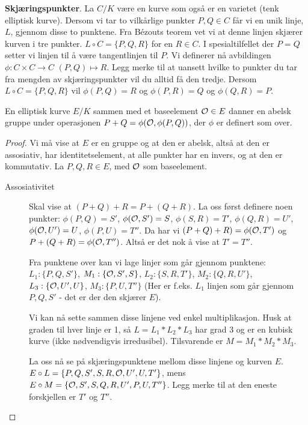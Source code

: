 \textbf{Skjæringspunkter}. La $C/K$ være en kurve som også er en varietet (tenk elliptisk kurve). Dersom vi tar to vilkårlige punkter $P, Q \in C$ får vi en unik linje, $L$, gjennom disse to punktene. Fra Bézouts teorem vet vi at denne linjen skjærer kurven i tre punkter. $L \circ C = \{P, Q, R \}$ for en $R \in C$. I spesialtilfellet der $P = Q$ setter vi linjen til å være tangentlinjen til $P$. Vi definerer nå avbildingen $\phi: C \times C \rightarrow C$ $(P, Q) \mapsto R$. Legg merke til at uansett hvilke to punkter du tar fra mengden av skjæringspunkter vil du alltid få den tredje. Dersom $L \circ C = \{P, Q, R\}$ vil $\phi(P, Q) = R$ og $\phi(P, R) = Q$ og $\phi(Q, R) = P$.

\begin{teorem}
En elliptisk kurve $E/K$ sammen med et baseelement $\mathcal{O} \in E$ danner en abelsk gruppe under operasjonen $P + Q = \phi(\mathcal{O}, \phi(P, Q))$, der $\phi$ er definert som over.

\begin{proof}
Vi må vise at $E$ er en gruppe og at den er abelsk, altså at den er assosiativ, har identitetselement, at alle punkter har en invers, og at den er kommutativ. La $P, Q, R \in E$, med $\mathcal{O}$ som baseelement.
\begin{description}
\item[Assosiativitet] Skal vise at $(P + Q)+ R = P + (Q + R)$. La oss først definere noen punkter: $\phi(P,Q) = S'$, $\phi(\mathcal{O}, S') = S$, $\phi(S, R) = T'$, $\phi(Q, R) = U'$, $\phi(\mathcal{O}, U') = U$, $\phi(P, U) = T''$. Da har vi $(P + Q) + R) = \phi(\mathcal{O}, T')$ og $P + (Q + R) = \phi(\mathcal{O}, T'')$. Altså er det nok å vise at $T' = T''$.

Fra punktene over kan vi lage linjer som går gjennom punktene: $L_1: \{P, Q, S'\}$, $M_1: \{\mathcal{O}, S', S\}$, $L_2: \{S, R, T' \}$, $M_2: \{ Q, R, U'\}$, $L_3: \{\mathcal{O}, U', U \}$, $M_3: \{P, U, T''\}$ (Her er f.eks. $L_1$ linjen som går gjennom $P, Q, S'$ - det er der den skjærer $E$).

Vi kan nå sette sammen disse linjene ved enkel multiplikasjon. Husk at graden til hver linje er 1, så $L = L_1 * L_2 * L_3$ har grad 3 og er en kubisk kurve (ikke nødvendigvis irredusibel). Tilsvarende er $M = M_1 * M_2 * M_3$. 

La oss nå se på skjæringspunktene mellom disse linjene og kurven $E$. $E \circ L = \{P, Q, S', S, R, \mathcal{O}, U', U, T' \}$, mens $E \circ M = \{\mathcal{O}, S', S, Q, R, U', P, U, T'' \}$. Legg merke til at den eneste forskjellen er $T'$ og $T''$.


\end{description}
\end{proof}
\end{teorem}
